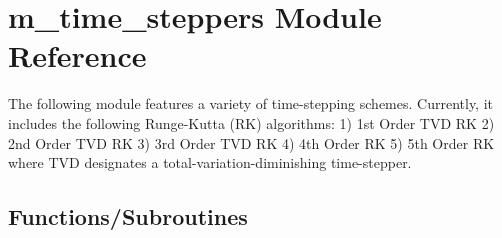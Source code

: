 \hypertarget{namespacem__time__steppers}{}\section{m\+\_\+time\+\_\+steppers Module Reference}
\label{namespacem__time__steppers}


The following module features a variety of time-\/stepping schemes. Currently, it includes the following Runge-\/\+Kutta (RK) algorithms\+: 1) 1st Order T\+VD RK 2) 2nd Order T\+VD RK 3) 3rd Order T\+VD RK 4) 4th Order RK 5) 5th Order RK where T\+VD designates a total-\/variation-\/diminishing time-\/stepper.  


\subsection*{Functions/\+Subroutines}
